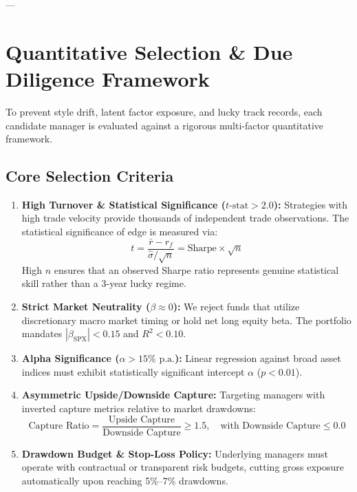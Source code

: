 \documentclass[11pt,a4paper]{article}
\begin{document}
---

\section{Quantitative Selection \& Due Diligence Framework}

To prevent style drift, latent factor exposure, and lucky track records, each candidate manager is evaluated against a rigorous multi-factor quantitative framework.

\subsection{Core Selection Criteria}

\begin{enumerate}[leftmargin=1.5em, itemsep=0.5em]
    \item \textbf{High Turnover \& Statistical Significance ($t\text{-stat} > 2.0$):}
    Strategies with high trade velocity provide thousands of independent trade observations. The statistical significance of edge is measured via:
    \begin{equation}
    t = \frac{\bar{r} - r_f}{\hat{\sigma} / \sqrt{n}} = \text{Sharpe} \times \sqrt{n}
    \end{equation}
    High $n$ ensures that an observed Sharpe ratio represents genuine statistical skill rather than a 3-year lucky regime.
    
    \item \textbf{Strict Market Neutrality ($\beta \approx 0$):}
    We reject funds that utilize discretionary macro market timing or hold net long equity beta. The portfolio mandates $|\beta_{\text{SPX}}| < 0.15$ and $R^2 < 0.10$.
    
    \item \textbf{Alpha Significance ($\alpha > 15\% \text{ p.a.}$):}
    Linear regression against broad asset indices must exhibit statistically significant intercept $\alpha$ ($p < 0.01$).
    
    \item \textbf{Asymmetric Upside/Downside Capture:}
    Targeting managers with inverted capture metrics relative to market drawdowns:
    \begin{equation}
    \text{Capture Ratio} = \frac{\text{Upside Capture}}{\text{Downside Capture}} \ge 1.5, \quad \text{with Downside Capture} \le 0.0
    \end{equation}
    
    \item \textbf{Drawdown Budget \& Stop-Loss Policy:}
    Underlying managers must operate with contractual or transparent risk budgets, cutting gross exposure automatically upon reaching 5\%--7\% drawdowns.
\end{enumerate}
\end{document}
